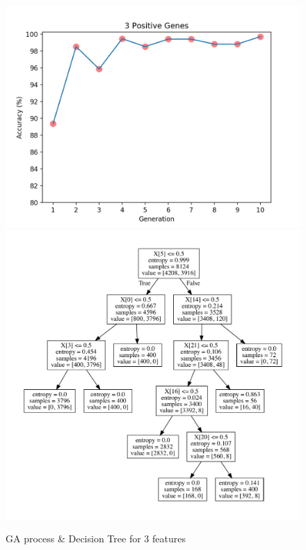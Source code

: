 \documentclass[runningheads]{llncs}
\begin{document}
\begin{figure}[htbp]
	\centering
	\includegraphics[scale=0.5]{GA3}
	\includegraphics[scale=0.5]{tree3}
	\caption{GA process \& Decision Tree for 3 features}
	\label{fig-3}
\end{figure}
\end{document}
